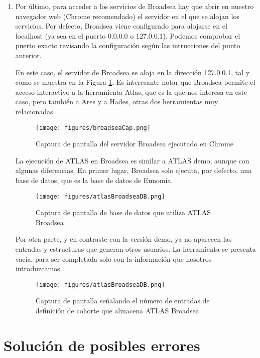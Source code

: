 \begin{enumerate}
    \item Por último, para acceder a los servicios de Broadsea hay que abrir en nuestro navegador web (Chrome recomendado) el servidor en el que se alojan los servicios. Por defecto, Broadsea viene configurado para alojarse en el localhost (ya sea en el puerto 0.0.0.0 o 127.0.0.1). Podemos comprobar el puerto exacto revisando la configuración según las intrucciones del punto anterior.

    En este caso, el servidor de Broadsea se aloja en la dirección 127.0.0.1, tal y como se muestra en la Figura \ref{fig:broadseaCap}. Es interesante notar que Broadsea permite el acceso interactivo a la herramienta Atlas, que es la que nos interesa en este caso, pero también a Ares y a Hades, otras dos herramientas muy relacionadas.

\begin{figure}[H]
    \centering
    \texttt{[image: figures/broadseaCap.png]}
     \caption{Captura de pantalla del servidor Broadsea ejecutado en Chrome}
    \label{fig:broadseaCap}
\end{figure}

    La ejecución de ATLAS en Broadsea es similar a ATLAS demo, aunque con algunas diferencias. En primer lugar, Broadsea solo ejecuta, por defecto, una base de datos, que es la base de datos de Eunomia.

\begin{figure}[H]
    \centering
    \texttt{[image: figures/atlasBroadseaDB.png]}
     \caption{Captura de pantalla de base de datos que utiliza ATLAS Broadsea}
    \label{fig:atlasBroadseaDB}
\end{figure}

    Por otra parte, y en contraste con la versión demo, ya no aparecen las entradas y estructuras que generan otros usuarios. La herramienta se presenta vacía, para ser completada solo con la información que nosotros introduzcamos.

\begin{figure}[H]
    \centering
    \texttt{[image: figures/atlasBroadseaDB.png]}
     \caption{Captura de pantalla señalando el número de entradas de definición de cohorte que almacena ATLAS Broadsea}
    \label{fig:atlasBroadseaDB}
\end{figure}
    
\end{enumerate}

\section{Solución de posibles errores}

